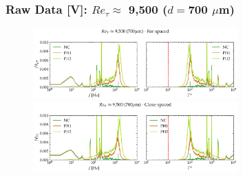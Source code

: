 \documentclass[aspectratio=169,9pt]{beamer}
\begin{document}




\begin{frame}
  \frametitle{Raw Data [V]: $Re_\tau \approx$ 9,500 ($d=$700 $\mu$m)}
  \begin{figure}
    \centering
    \includegraphics[width=0.7\textwidth]{raw_spectra/700_100psi_raw_spec_far.png}
    \includegraphics[width=0.7\textwidth]{raw_spectra/700_100psi_raw_spec_close.png}
  \end{figure}
\end{frame}
\end{document}
